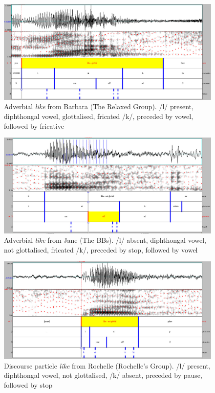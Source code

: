 \begin{figure}[p]
	\centering
		\includegraphics[width=5in]{images/barbara19.jpg}
	\caption{Adverbial \textit{like} from Barbara (The Relaxed Group). /l/ pre\-sent, diph\-thongal vowel, glottalised, fricated /k/, preceded by vowel, followed by fricative}
	\label{fig:barbara19}
\end{figure}

\begin{figure}[p]
	\centering
		\includegraphics[width=5in]{images/jane37.jpg}
	\caption{Adverbial \textit{like} from Jane (The BBs). /l/ absent, diphthongal vowel, not glottalised, fricated /k/, preceded by stop, followed by vowel}
	\label{fig:jane37}
\end{figure}

\begin{figure}[p]
	\centering
		\includegraphics[width=5in]{images/rochelle2.jpg}
	\caption{Discourse particle \textit{like} from Rochelle (Rochelle's Group). /l/ present, diphthongal vowel, not glottalised, /k/ absent, preceded by pause, followed by stop}
	\label{fig:rochelle2}
\end{figure}

